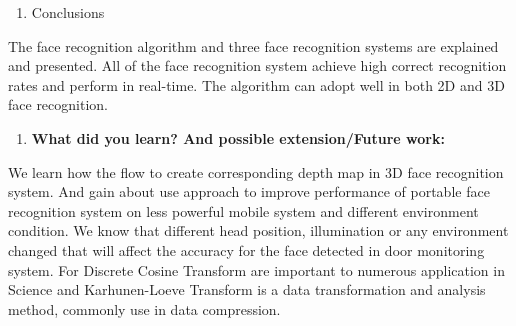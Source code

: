 \documentclass[a4paper,12pt]{article}
\begin{document}
\maketitle
\begin{enumerate}[{5.}]\bfseries
\item{\normalsize Conclusions}
\end{enumerate}
The face recognition algorithm and three face recognition systems are explained and presented. All of the face recognition system achieve high correct recognition rates and perform in real-time. The algorithm can adopt well in both 2D and 3D face recognition.\\


\maketitle
\begin{enumerate}[{6.}]\bfseries
\item{\normalsize \textbf{What did you learn? And possible extension/Future work:} }
\end{enumerate}
We learn how the flow to create corresponding depth map in 3D face recognition system. And gain about use approach to improve performance of portable face recognition system on less powerful mobile system and different environment condition. We know that different head position, illumination or any environment changed that will affect the accuracy for the face detected in door monitoring system. For Discrete Cosine Transform are important to numerous application in Science and Karhunen-Loeve Transform is a data transformation and analysis method, commonly use in data compression.\\

{}
\end{document}
